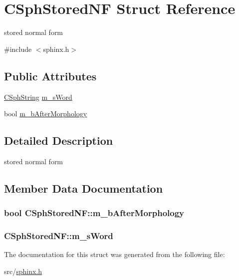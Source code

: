 \hypertarget{structCSphStoredNF}{\section{C\-Sph\-Stored\-N\-F Struct Reference}
\label{structCSphStoredNF}
}


stored normal form  




{\ttfamily \#include $<$sphinx.\-h$>$}

\subsection*{Public Attributes}
\begin{DoxyCompactItemize}
\item 
\hyperlink{structCSphString}{C\-Sph\-String} \hyperlink{structCSphStoredNF_a921af276e3a1a301689afe75ba8b80a9}{m\-\_\-s\-Word}
\item 
bool \hyperlink{structCSphStoredNF_aaf44c6bab33f136fe97cf295e66828cd}{m\-\_\-b\-After\-Morphology}
\end{DoxyCompactItemize}


\subsection{Detailed Description}
stored normal form 

\subsection{Member Data Documentation}
\hypertarget{structCSphStoredNF_aaf44c6bab33f136fe97cf295e66828cd}{
\subsubsection[{m\-\_\-b\-After\-Morphology}]{\setlength{\rightskip}{0pt plus 5cm}bool C\-Sph\-Stored\-N\-F\-::m\-\_\-b\-After\-Morphology}}\label{structCSphStoredNF_aaf44c6bab33f136fe97cf295e66828cd}
\hypertarget{structCSphStoredNF_a921af276e3a1a301689afe75ba8b80a9}{
\subsubsection[{m\-\_\-s\-Word}]{ C\-Sph\-Stored\-N\-F\-::m\-\_\-s\-Word}}\label{structCSphStoredNF_a921af276e3a1a301689afe75ba8b80a9}


The documentation for this struct was generated from the following file\-:\begin{DoxyCompactItemize}
\item 
src/\hyperlink{sphinx_8h}{sphinx.\-h}\end{DoxyCompactItemize}
